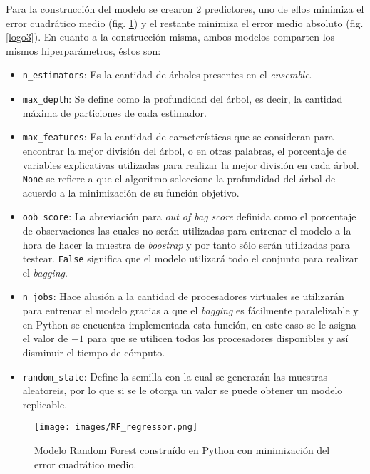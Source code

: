 Para la construcción del modelo se crearon 2 predictores, uno de ellos minimiza el error cuadrático medio (fig. \ref{logo2}) y el restante minimiza el error medio absoluto (fig. \ref{logo3}). En cuanto a la construcción misma, ambos modelos comparten los mismos hiperparámetros, 
éstos son:
\begin{itemize}
    \item \texttt{n\_estimators}: Es la cantidad de árboles presentes en el \textit{ensemble}. 
    \item \texttt{max\_depth}: Se define como la profundidad del árbol, es decir, la cantidad máxima de particiones de cada estimador.
    \item \texttt{max\_features}: Es la cantidad de características que se consideran para encontrar la mejor división del árbol, o en otras palabras, el porcentaje de variables explicativas utilizadas para realizar la mejor división en cada árbol. \texttt{None} 
    se refiere a que el algoritmo seleccione la profundidad del árbol de acuerdo a la minimización de su función objetivo.
    \item \texttt{oob\_score}: La abreviación para \textit{out of bag score} definida como el porcentaje de observaciones las cuales no serán utilizadas para entrenar el modelo a la hora de hacer la muestra de \textit{boostrap} y por tanto sólo serán utilizadas para testear.
    \texttt{False} significa que el modelo utilizará todo el conjunto para realizar el \textit{bagging}.
    \item \texttt{n\_jobs}: Hace alusión a la cantidad de procesadores virtuales se utilizarán para entrenar el modelo gracias a que el \textit{bagging} es fácilmente paralelizable y en Python se encuentra implementada esta función, en este caso se le asigna el valor de  
    $-1$ para que se utilicen todos los procesadores disponibles y así disminuir el tiempo de cómputo.
    \item \texttt{random\_state}: Define la semilla con la cual se generarán las muestras aleatoreis, por lo que si se le otorga un valor se puede obtener un modelo replicable.
\end{itemize}

\begin{figure}[H]
    \centering
          \texttt{[image: images/RF\_regressor.png]}
          \vskip -0.1in
    \caption[Construcción y entrenamiento del modelo Random Forest con criterio de \textit{mse}]{\footnotesize Modelo Random Forest construído en Python con minimización del error cuadrático medio.}
    \label{logo2}
\end{figure}

